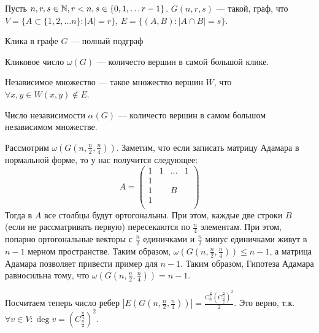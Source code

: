 

\begin{definition}
    Пусть \(n, r, s \in \mathbb{N}, r < n, s \in \{0, 1, \dots r- 1\}\). \(G(n, r, s)\) --- такой, граф, что \(V = \{A \subset \{1, 2, \dots n\}: |A| = r\}\), \(E = \{(A, B) : |A \cap B| = s\}\).
\end{definition}

\begin{definition}
    Клика в графе \(G\) --- полный подграф
\end{definition}
\begin{definition}
    Кликовое число \(\omega(G)\) --- количесто вершин в самой большой клике.
\end{definition}
\begin{definition}
    Независимое множество --- такое множество вершин \(W\), что \(\forall x, y \in W (x, y) \notin E\).
\end{definition}
\begin{definition}
    Число независимости \(\alpha(G)\) --- количесто вершин в самом большом независимом множестве.
\end{definition}


Рассмотрим \(\omega\left(G\left(n, \frac{n}{2}, \frac{n}{4}\right)\right)\). Заметим, что если записать матрицу Адамара в нормальной форме, то у нас получится следующее:
\[A = \left(\begin{array}{cccc}
    1 & 1 & \dots & 1 \\
    1 & & & \\
    1 & & B & \\
    1 & & & \\
\end{array}\right)\]
Тогда в \(A\) все столбцы будут ортогональны. При этом, каждые две строки \(B\) (если не рассматривать первую) пересекаются по \(\frac{n}{4}\) элементам. При этом, попарно ортогональные векторы с \(\frac{n}{2}\) единичками и \(\frac{n}{2}\) минус единичками живут в \(n - 1\) мерном пространстве. Таким образом, \(\omega\left(G\left(n, \frac{n}{2}, \frac{n}{4}\right)\right) \le n - 1\), а матрица Адамара позволяет привести пример для \(n - 1\). Таким образом, Гипотеза Адамара равносильна тому, что \(\omega\left(G\left(n, \frac{n}{2}, \frac{n}{4}\right)\right) = n - 1\).

Посчитаем теперь число ребер \(\left|E\left(G\left(n, \frac{n}{2}, \frac{n}{4}\right)\right)\right| = \frac{C_n^{\frac{n}{2}}\left(C_{\frac{n}{2}}^{\frac{n}{4}}\right)^2}{2}\). Это верно, т.к. \(\forall v \in V: \deg v = \left(C_{\frac{n}{2}}^{\frac{n}{4}}\right)^2\).

